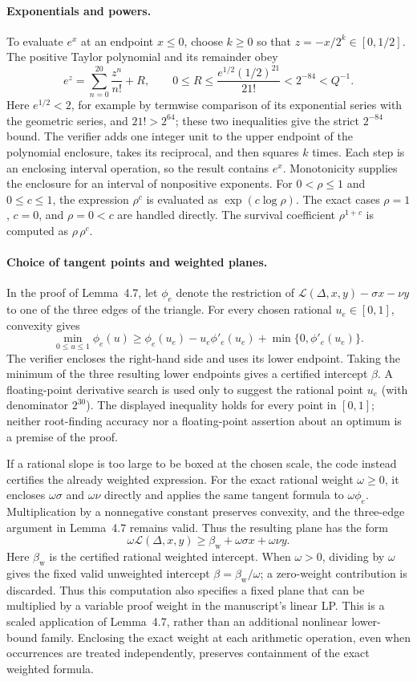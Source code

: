 \documentclass[11pt,a4paper]{article}
\begin{document}
\paragraph{Exponentials and powers.}
To evaluate $e^x$ at an endpoint $x\le0$, choose $k\ge0$ so that
$z=-x/2^k\in[0,1/2]$.  The positive Taylor polynomial and its remainder obey
\[
 e^z=\sum_{n=0}^{20}\frac{z^n}{n!}+R,
 \qquad
 0\le R\le\frac{e^{1/2}(1/2)^{21}}{21!}<2^{-84}<Q^{-1}.
\]
Here $e^{1/2}<2$, for example by termwise comparison of its exponential
series with the geometric series, and $21!>2^{64}$; these two inequalities
give the strict $2^{-84}$ bound.  The verifier adds one integer unit to the
upper endpoint of the polynomial enclosure, takes its reciprocal, and then
squares $k$ times.  Each step is an enclosing interval operation, so the
result contains $e^x$.  Monotonicity supplies the enclosure for an interval
of nonpositive exponents.  For $0<\rho\le1$ and $0\le c\le1$, the expression
$\rho^c$ is evaluated as $\exp(c\log\rho)$.  The exact cases $\rho=1$, $c=0$,
and $\rho=0<c$ are handled directly.  The survival coefficient
$\rho^{1+c}$ is computed as $\rho\,\rho^c$.

\paragraph{Choice of tangent points and weighted planes.}
In the proof of Lemma~4.7, let $\phi_e$ denote the restriction of
$\mathcal L(\Delta,x,y)-\sigma x-\nu y$ to one of the three edges of the triangle.
For every chosen rational $u_e\in[0,1]$, convexity gives
\[
 \min_{0\le u\le1}\phi_e(u)
 \ge \phi_e(u_e)-u_e\phi'_e(u_e)+\min\{0,\phi'_e(u_e)\}.
\]
The verifier encloses the right-hand side and uses its lower endpoint.
Taking the minimum of the three resulting lower endpoints gives a certified
intercept $\beta$.  A floating-point derivative search is used only to
suggest the rational point $u_e$ (with denominator $2^{30}$).  The displayed
inequality holds for every point in $[0,1]$; neither root-finding accuracy nor
a floating-point assertion about an optimum is a premise of the proof.

If a rational slope is too large to be boxed at the chosen scale, the code
instead certifies the already weighted expression.  For the exact rational
weight $\omega\ge0$, it encloses $\omega\sigma$ and $\omega\nu$ directly and
applies the same tangent formula to $\omega\phi_e$.
Multiplication by a nonnegative constant preserves convexity, and the
three-edge argument in Lemma~4.7 remains valid.  Thus the resulting plane
has the form
\[
 \omega \mathcal L(\Delta,x,y)
 \ge \beta_{\mathrm w}+\omega\sigma x+\omega\nu y.
\]
Here $\beta_{\mathrm w}$ is the certified rational weighted intercept.
When $\omega>0$, dividing by $\omega$ gives the fixed valid unweighted
intercept $\beta=\beta_{\mathrm w}/\omega$; a zero-weight contribution is
discarded. Thus this computation also specifies a fixed plane that can be
multiplied by a variable proof weight in the manuscript's linear LP.
This is a scaled application of Lemma~4.7, rather than an additional
nonlinear lower-bound family.  Enclosing the exact weight at each arithmetic
operation, even when occurrences are treated independently, preserves
containment of the exact weighted formula.
\end{document}
